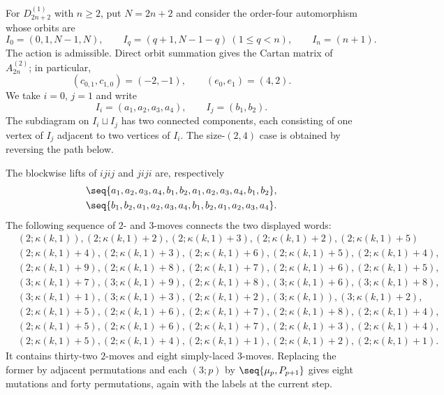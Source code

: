 \documentclass[12pt, leqno]{amsart}
\numberwithin{equation}{section}
\theoremstyle{plain}
\theoremstyle{definition}
\renewcommand{\le}{\leqslant}
\renewcommand{\ge}{\geqslant}
\begin{document}
For $D_{2n+2}^{(1)}$ with $n\ge2$, put $N=2n+2$ and consider the order-four
automorphism whose orbits are
\[
 I_0=(0,1,N-1,N),\qquad
 I_q=(q+1,N-1-q)\ (1\le q<n),\qquad
 I_n=(n+1).
\]
The action is admissible.  Direct orbit summation gives the Cartan
matrix of $A_{2n}^{(2)}$; in particular,
\[
 (c_{0,1},c_{1,0})=(-2,-1),\qquad(e_0,e_1)=(4,2).
\]
We take $i=0$, $j=1$ and write
\[
 I_i=(a_1,a_2,a_3,a_4),\qquad I_j=(b_1,b_2).
\]
The  subdiagram on $I_i\sqcup I_j${} has two connected components, each consisting of one
vertex of $I_j$ adjacent to two vertices of $I_i$.
 The size-$(2,4)$ case is obtained by reversing the path below.

 The blockwise lifts of $ijij$ and $jiji$ are, respectively
\[
\begin{aligned}
 &\seq{a_1,a_2,a_3,a_4,b_1,b_2,
       a_1,a_2,a_3,a_4,b_1,b_2},\\
 &\seq{b_1,b_2,a_1,a_2,a_3,a_4,
       b_1,b_2,a_1,a_2,a_3,a_4}.
\end{aligned}
\]
 The following sequence of $2$- and $3$-moves connects the two displayed words:{}
\begin{equation}
\label{eq: affine lifted 4-move 42}
\begin{aligned}
&(2;\kappa(k,1)),(2;\kappa(k,1)+2),(2;\kappa(k,1)+3),(2;\kappa(k,1)+2),
 (2;\kappa(k,1)+5) \\
& (2;\kappa(k,1)+4),(2;\kappa(k,1)+3),(2;\kappa(k,1)+6),(2;\kappa(k,1)+5),
  (2;\kappa(k,1)+4), \\
& (2;\kappa(k,1)+9),(2;\kappa(k,1)+8), (2;\kappa(k,1)+7),(2;\kappa(k,1)+6),
  (2;\kappa(k,1)+5), \\
& (3;\kappa(k,1)+7),(3;\kappa(k,1)+9),(2;\kappa(k,1)+8), (3;\kappa(k,1)+6),
  (3;\kappa(k,1)+8), \\
& (3;\kappa(k,1)+1),(3;\kappa(k,1)+3), (2;\kappa(k,1)+2),(3;\kappa(k,1)),
  (3;\kappa(k,1)+2), \\
& (2;\kappa(k,1)+5),(2;\kappa(k,1)+6),(2;\kappa(k,1)+7), (2;\kappa(k,1)+8),
  (2;\kappa(k,1)+4), \\
& (2;\kappa(k,1)+5), (2;\kappa(k,1)+6),(2;\kappa(k,1)+7),(2;\kappa(k,1)+3),
  (2;\kappa(k,1)+4), \\
& (2;\kappa(k,1)+5), (2;\kappa(k,1)+4), (2;\kappa(k,1)+1),(2;\kappa(k,1)+2),
  (2;\kappa(k,1)+1).
\end{aligned}
\end{equation}
It contains thirty-two $2$-moves and eight simply-laced $3$-moves.
Replacing the former by adjacent permutations and each $(3;p)$ by
$\seq{\mu_p,P_{p+1}}$ gives eight mutations and forty permutations,
again with the labels at the current step.
\end{document}
